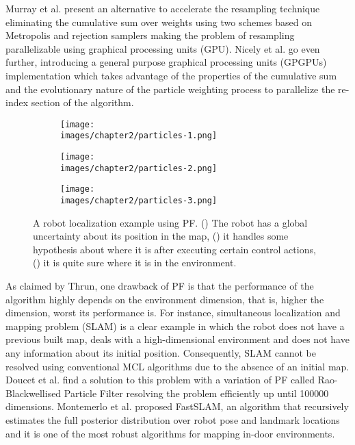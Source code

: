 Murray et al. present an alternative to accelerate the resampling technique eliminating the cumulative sum over weights using two schemes based on Metropolis\cite{Metropolis:fast-computing} and rejection samplers making the problem of resampling parallelizable using graphical processing units (GPU)\cite{Murray:parallel-res}. Nicely et al. go even further, introducing a general purpose graphical processing units (GPGPUs) implementation which takes advantage of the properties of the cumulative sum and the evolutionary nature of the particle weighting process to parallelize the re-index section of the algorithm\cite{Nicely:improvised-parallel-res}.


\begin{figure}[h!]
  \centering
  \begin{subfigure}[b]{0.65\linewidth}
  	\texttt{[image: \\images/chapter2/particles-1.png]}
	\caption{}
  	\label{fig:ch-2:particles-1}
  \end{subfigure}
  \begin{subfigure}[b]{0.47\linewidth}
  	\texttt{[image: \\images/chapter2/particles-2.png]}
	\caption{}
  	\label{fig:ch-2:particles-2}
  \end{subfigure}
  \vspace{0.00mm}
  \begin{subfigure}[b]{0.47\linewidth}
  	\texttt{[image: \\images/chapter2/particles-3.png]}
	\caption{}
  	\label{fig:ch-2:particles-3}
  \end{subfigure}
  \vspace{0.00mm}
  \caption[A robot localization example using PF.]{A robot localization example using PF. () The robot has a global uncertainty about its position in the map, () it handles some hypothesis about where it is after executing certain control actions, () it is quite sure where it is in the environment.}
  \label{fig:ch-2:particles-ex}
\end{figure}

As claimed by Thrun, one drawback of PF is that the performance of the algorithm highly depends on the environment dimension, that is, higher the dimension, worst its performance is. For instance, simultaneous localization and mapping problem (SLAM) is a clear example in which the robot does not have a previous built map, deals with a high-dimensional environment and does not have any information about its initial position. Consequently, SLAM cannot be resolved using conventional MCL algorithms due to the absence of an initial map. Doucet et al. find a solution to this problem with a variation of PF called Rao-Blackwellised Particle Filter resolving the problem efficiently up until 100000 dimensions\cite{Doucet:2000:RPF:2073946.2073968}. Montemerlo et al. proposed FastSLAM, an algorithm that recursively estimates the full posterior distribution over robot pose and landmark locations\cite{Montemerlo02a} and it is one of the most robust algorithms for mapping in-door environments\cite{Thrun:particle-filter-robotics}.


